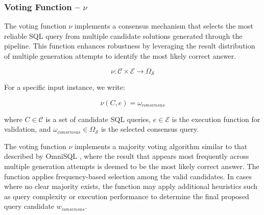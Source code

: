 \subsubsection{Voting Function – $\nu$}\label{design:voting-function}

The voting function $\nu$ implements a consensus mechanism that selects the most
reliable SQL query from multiple candidate solutions generated through the pipeline.
This function enhances robustness by leveraging the result distribution of multiple
generation attempts to identify the most likely correct answer.

$$
\nu: \mathcal{C} \times \mathcal{E} \rightarrow \Omega_{\mathcal{S}}
$$

\vspace{0.5em}

For a specific input instance, we write:

$$
\nu(C, e) = \omega_{consensus}
$$

where $C \in \mathcal{C}$ is a set of candidate SQL queries, $e \in \mathcal{E}$ is
the execution function for validation, and $\omega_{consensus} \in \Omega_{\mathcal{S}}$
is the selected consensus query.

\vspace{0.5em}

The voting function $\nu$ implements a majority voting algorithm similar to that
described by OmniSQL \citep{OmniSQL}, where the result that appears most frequently
across multiple generation attempts is deemed to be the most likely correct answer.
The function applies frequency-based selection among the valid candidates. In cases where
no clear majority exists, the function may apply additional heuristics such as query
complexity or execution performance to determine the final proposed query candidate $w_{consensus}$.
